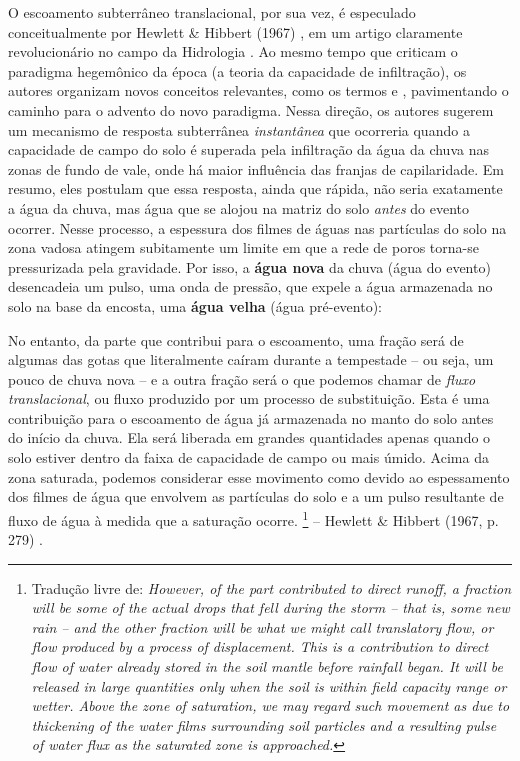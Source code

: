 \documentclass[./main.tex]{subfiles}
\begin{document}
\par O escoamento subterrâneo translacional, por sua vez, é especulado conceitualmente por Hewlett \& Hibbert (1967) \cite{Hewlett1967}, em um artigo claramente revolucionário no campo da Hidrologia \cite{McDonnell2009}. Ao mesmo tempo que criticam o paradigma hegemônico da época (a teoria da capacidade de infiltração), os autores organizam novos conceitos relevantes, como os termos  e , pavimentando o caminho para o advento do novo paradigma. Nessa direção, os autores sugerem um mecanismo de resposta subterrânea \textit{instantânea} que ocorreria quando a capacidade de campo do solo é superada pela infiltração da água da chuva nas zonas de fundo de vale, onde há maior influência das franjas de capilaridade. Em resumo, eles postulam que essa resposta, ainda que rápida, não seria exatamente a água da chuva, mas água que se alojou na matriz do solo \textit{antes} do evento ocorrer. Nesse processo, a espessura dos filmes de águas nas partículas do solo na zona vadosa atingem subitamente um limite em que a rede de poros torna-se pressurizada pela gravidade. Por isso, a \textbf{água nova} da chuva (água do evento) desencadeia um pulso, uma onda de pressão, que expele a água armazenada no solo na base da encosta, uma \textbf{água velha} (água pré-evento):

\begin{adjustwidth}{100pt}{0pt}
\medskip
\small
No entanto, da parte que contribui para o escoamento, uma fração será de algumas das gotas que literalmente caíram durante a tempestade -- ou seja, um pouco de chuva nova -- e a outra fração será o que podemos chamar de \textit{fluxo translacional}, ou fluxo produzido por um processo de substituição. Esta é uma contribuição para o escoamento de água já armazenada no manto do solo antes do início da chuva. Ela será liberada em grandes quantidades apenas quando o solo estiver dentro da faixa de capacidade de campo ou mais úmido. Acima da zona saturada, podemos considerar esse movimento como devido ao espessamento dos filmes de água que envolvem as partículas do solo e a um pulso resultante de fluxo de água à medida que a saturação ocorre.
\footnote{Tradução livre de: 
\textit{
However, of the part contributed to direct runoff, a fraction will be some of the actual drops that fell during the storm -- that is, some new rain -- and the other fraction will be what we might call translatory flow, or flow produced by a process of displacement. This is a contribution to direct flow of water already stored in the soil mantle before rainfall began. It will be released in large quantities only when the soil is within field capacity range or wetter. Above the zone of saturation, we may regard such movement as due to thickening of the water films surrounding soil particles and a resulting pulse of water flux as the saturated zone is approached.
}} -- Hewlett \& Hibbert (1967, p. 279) \cite{Hewlett1967}.
\medskip
\end{adjustwidth}
\end{document}
